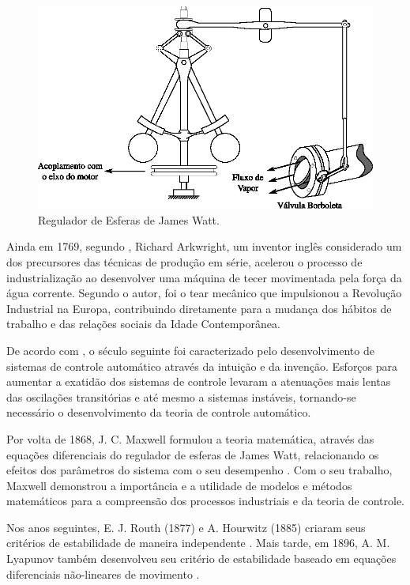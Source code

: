 \begin{figure}[htb]
\centering
    \includegraphics{imgs/introducao/eps/regulador_esferas}
    \caption{Regulador de Esferas de James Watt.}
    \label{fig:controlador_james}
\end{figure}

Ainda em 1769, segundo , Richard Arkwright, um inventor
inglês considerado um dos precursores das técnicas de produção em série,
acelerou o processo de industrialização ao desenvolver uma máquina de tecer
movimentada pela força da água corrente. Segundo o autor, foi o tear mecânico
que impulsionou a Revolução Industrial na Europa, contribuindo diretamente para
a mudança dos hábitos de trabalho e das relações sociais da Idade Contemporânea. 

De acordo com , o século seguinte foi caracterizado pelo
desenvolvimento de sistemas de controle automático através da intuição e da
invenção. Esforços para aumentar a exatidão dos sistemas de controle levaram a
atenuações mais lentas das oscilações transitórias e até mesmo a sistemas
instáveis, tornando-se necessário o desenvolvimento da teoria de controle
automático.

Por volta de 1868, J. C. Maxwell formulou a teoria matemática, através das
equações diferenciais do regulador de esferas de James Watt, relacionando os
efeitos dos parâmetros do sistema com o seu desempenho \cite{maxwell:1964}. Com
o seu trabalho, Maxwell demonstrou a importância e a utilidade de modelos e
métodos matemáticos para a compreensão dos processos industriais e da teoria de
controle.

Nos anos seguintes, E. J. Routh (1877) e A. Hourwitz (1885) criaram seus
critérios de estabilidade de maneira independente
\cite{routh:1877,bennett:1996}. Mais tarde, em 1896, A. M. Lyapunov também
desenvolveu seu critério de estabilidade baseado em equações diferenciais
não-lineares de movimento \cite{faccin:2004}.

